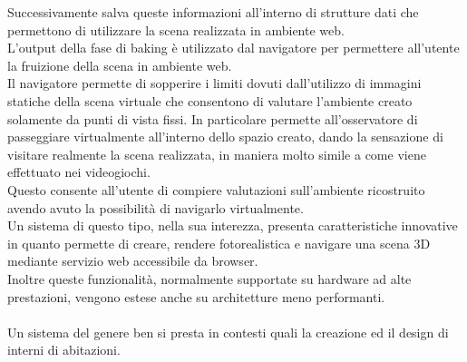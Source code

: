 Successivamente salva queste informazioni all'interno di strutture dati che permettono di utilizzare la scena realizzata in ambiente web. 
\\
L'output della fase di baking è utilizzato dal navigatore per permettere all'utente la fruizione della scena in ambiente web.
\\
Il navigatore  permette di sopperire i limiti dovuti dall’utilizzo di immagini statiche della scena virtuale che consentono di valutare l’ambiente creato solamente da punti di vista fissi.
In particolare permette all’osservatore di passeggiare virtualmente all’interno dello spazio creato, dando la sensazione di visitare realmente la scena realizzata, in maniera molto simile a come viene effettuato nei videogiochi.
\\
Questo consente all'utente di compiere valutazioni sull'ambiente ricostruito avendo avuto la possibilità di navigarlo virtualmente.
\\
Un sistema di questo tipo, nella sua interezza, presenta caratteristiche innovative in quanto permette di creare, rendere fotorealistica e navigare una scena 3D mediante servizio web accessibile da browser. 
\\
Inoltre queste funzionalità, normalmente supportate su hardware ad alte prestazioni, vengono estese anche su architetture meno performanti.
\\
\\
Un sistema del genere ben si presta in contesti quali la creazione ed il design di interni di abitazioni.
